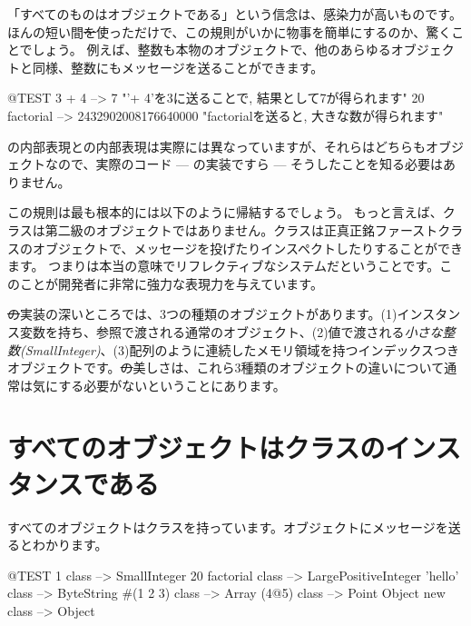 \documentclass[a4paper,10pt,twoside]{book}
\begin{document}

「すべてのものはオブジェクトである」という信念は、感染力が高いものです。
ほんの短い間\st を使っただけで、この規則がいかに物事を簡単にするのか、驚くことでしょう。
例えば、整数も本物のオブジェクトで、他のあらゆるオブジェクトと同様、整数にもメッセージを送ることができます。

\begin{code}{@TEST}
3 + 4            --> 7    "'+ 4'を3に送ることで, 結果として7が得られます"
20 factorial  --> 2432902008176640000   "factorialを送ると, 大きな数が得られます"
\end{code}

の内部表現との内部表現は実際には異なっていますが、それらはどちらもオブジェクトなので、実際のコード --- の実装ですら --- そうしたことを知る必要はありません。

この規則は最も根本的には以下のように帰結するでしょう。
もっと言えば、クラスは第二級のオブジェクトではありません。クラスは正真正銘ファーストクラスのオブジェクトで、メッセージを投げたりインスペクトしたりすることができます。
つまり\pharo は本当の意味でリフレクティブなシステムだということです。このことが開発者に非常に強力な表現力を与えています。

\st の実装の深いところでは、3つの種類のオブジェクトがあります。(1)インスタンス変数を持ち、参照で渡される通常のオブジェクト、(2)値で渡される\emph{小さな整数(SmallInteger)}、(3)配列のように連続したメモリ領域を持つインデックスつきオブジェクトです。\st の美しさは、これら3種類のオブジェクトの違いについて通常は気にする必要がないということにあります。

\section{すべてのオブジェクトはクラスのインスタンスである}


すべてのオブジェクトはクラスを持っています。オブジェクトにメッセージを送るとわかります。

\begin{code}{@TEST}
1 class                 --> SmallInteger
20 factorial class --> LargePositiveInteger
'hello' class          --> ByteString
#(1 2 3) class       --> Array
(4@5) class         --> Point
Object new class --> Object
\end{code}
\end{document}
